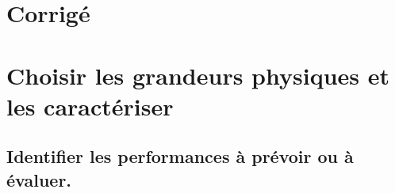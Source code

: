 \documentclass[10pt,fleqn]{article}
\newcommand{\repRel}{../..}
\newcommand{\repStyle}{\repRel/Style}
\newcommand{\td}{fichier_td}
\newcommand{\repExos}{\repRel/ExercicesCompetences}
\newcommand{\repExo}{dossier}
\begin{document}
\begin{multicols}{2} 

\end{multicols}

\proftrue
\setcounter{numexo}{0}

\section{Corrigé} 

\renewcommand{\repExo}{\repExos/A3_AnalyseFonctionnelleStructurelle/A3_01_ChaineFonctionnelle/58_Oz440}
\renewcommand{\td}{58_Oz440}
\graphicspath{{\repStyle/png/}{\repExo/images/}}


\renewcommand{\repExo}{\repExos/A3_AnalyseFonctionnelleStructurelle/A3_01_ChaineFonctionnelle/59_Levage}
\renewcommand{\td}{59_Levage}
\graphicspath{{\repStyle/png/}{\repExo/images/}}


\renewcommand{\repExo}{\repExos/A3_AnalyseFonctionnelleStructurelle/A3_01_ChaineFonctionnelle/60_Escalier}
\renewcommand{\td}{60_Escalier}
\graphicspath{{\repStyle/png/}{\repExo/images/}}


\renewcommand{\repExo}{\repExos/A3_AnalyseFonctionnelleStructurelle/A3_06_ChaineInfo/507_Divers}
\renewcommand{\td}{507_Divers}
\graphicspath{{\repStyle/png/}{\repExo/images/}}


\renewcommand{\repExo}{\repExos/A3_AnalyseFonctionnelleStructurelle/A3_06_ChaineInfo/50_BancBalafre}
\renewcommand{\td}{50_BancBalafre}
\graphicspath{{\repStyle/png/}{\repExo/images/}}


\renewcommand{\repExo}{\repExos/A3_AnalyseFonctionnelleStructurelle/A3_06_ChaineInfo/538_Codeur}
\renewcommand{\td}{538_Codeur}
\graphicspath{{\repStyle/png/}{\repExo/images/}}


\proffalse
\newpage
\def\xxchapitre{Modéliser}
\def\xxactivite{B}
\setcounter{section}{0}
\setcounter{numexo}{0}


\section{Choisir les grandeurs physiques et les caractériser} 

\subsection{Identifier les performances à prévoir ou à évaluer.} 
\end{document}
